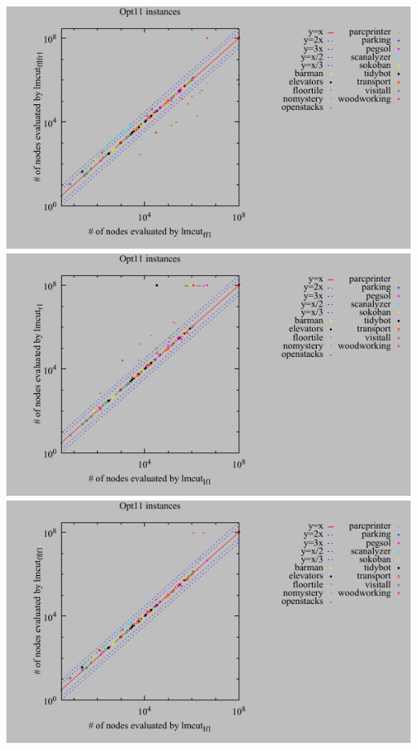 \includegraphics{tables/opt11-evaluated-lmcut_ff-lmcut_fflfr.pdf}
\linebreak
\includegraphics{tables/opt11-evaluated-lmcut_lf-lmcut_r.pdf}
\linebreak
\includegraphics{tables/opt11-evaluated-lmcut_lf-lmcut_fflf.pdf}
\linebreak
